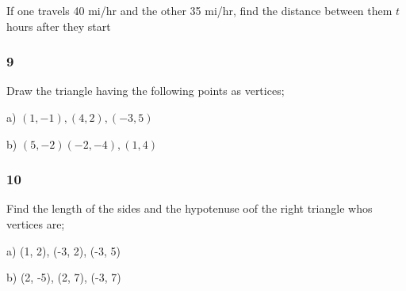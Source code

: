 \documentclass[]{report}
\begin{document}
If one travels 40 mi/hr and the other 35 mi/hr, find the distance between them $t$ hours after they start

\subsubsection{9}

Draw the triangle having the following points as vertices;

a) $(1, -1), (4, 2), (-3, 5)$


b) $(5, -2)(-2, -4), (1, 4)$


\subsubsection{10}

Find the length of the sides and the hypotenuse oof the right triangle whos vertices are;

a) (1, 2), (-3, 2), (-3, 5)

b) (2, -5), (2, 7), (-3, 7)
\end{document}
